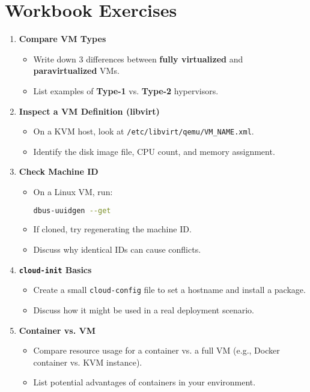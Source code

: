 \documentclass[12pt,a4paper]{report}
\begin{document}
\section*{Workbook Exercises}

\begin{enumerate}
    \item \textbf{Compare VM Types}
    \begin{itemize}
        \item Write down 3 differences between \textbf{fully virtualized} and \textbf{paravirtualized} VMs.
        \item List examples of \textbf{Type-1} vs. \textbf{Type-2} hypervisors.
    \end{itemize}

    \item \textbf{Inspect a VM Definition (libvirt)}
    \begin{itemize}
        \item On a KVM host, look at \texttt{/etc/libvirt/qemu/VM\_NAME.xml}.
        \item Identify the disk image file, CPU count, and memory assignment.
    \end{itemize}

    \item \textbf{Check Machine ID}
    \begin{itemize}
        \item On a Linux VM, run:
        \begin{lstlisting}[language=bash]
dbus-uuidgen --get
        \end{lstlisting}
        \item If cloned, try regenerating the machine ID.
        \item Discuss why identical IDs can cause conflicts.
    \end{itemize}

    \item \textbf{\texttt{cloud-init} Basics}
    \begin{itemize}
        \item Create a small \texttt{cloud-config} file to set a hostname and install a package.
        \item Discuss how it might be used in a real deployment scenario.
    \end{itemize}

    \item \textbf{Container vs. VM}
    \begin{itemize}
        \item Compare resource usage for a container vs. a full VM (e.g., Docker container vs. KVM instance).
        \item List potential advantages of containers in your environment.
    \end{itemize}
\end{enumerate}
\end{document}
